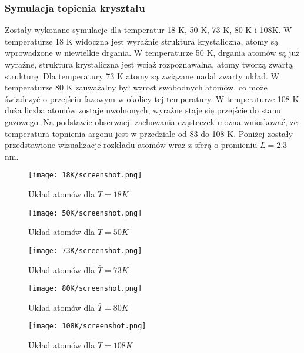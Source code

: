 \documentclass[a4paper,10pt]{article}
\begin{document}
	\subsubsection{Symulacja topienia kryształu}
	Zostały wykonane symulacje dla temperatur 18 K, 50 K, 73 K, 80 K i 108K. W temperaturze 18 K widoczna jest wyraźnie struktura krystaliczna, atomy są wprowadzone w niewielkie drgania. W temperaturze 50 K, drgania atomów są już wyraźne, struktura krystaliczna jest wciąż rozpoznawalna, atomy tworzą zwartą strukturę. Dla temperatury 73 K atomy są związane nadal zwarty układ. W temperaturze 80 K zauważalny był wzrost swobodnych atomów, co może świadczyć o przejściu fazowym w okolicy tej temperatury. W temperaturze 108 K duża liczba atomów zostaje uwolnonych, wyraźne staje się przejście do stanu gazowego. Na podstawie obserwacji zachowania cząsteczek można wnioskować, że temperatura topnienia argonu jest w przedziale od 83 do 108 K. Poniżej zostały przedstawione wizualizacje rozkładu atomów wraz z sferą o promieniu $L = 2.3$ nm.

	    \begin{figure}[h]
		    \centering
		    \texttt{[image: 18K/screenshot.png]}
		    \caption{Układ atomów dla $\bar{T} = 18 K$}
		    \label{18t}
	    \end{figure}

	    \begin{figure}[h]
		    \centering
		    \texttt{[image: 50K/screenshot.png]}
		    \caption{Układ atomów dla $\bar{T} = 50 K$}
		    \label{50t}
	    \end{figure}

	    \begin{figure}[h]
		    \centering
		    \texttt{[image: 73K/screenshot.png]}
		    \caption{Układ atomów dla $\bar{T} = 73 K$}
		    \label{73t}
	    \end{figure}

	    \begin{figure}[h]
		    \centering
		    \texttt{[image: 80K/screenshot.png]}
		    \caption{Układ atomów dla $\bar{T} = 80 K$}
		    \label{80t}
	    \end{figure}

	    \begin{figure}[h]
		    \centering
		    \texttt{[image: 108K/screenshot.png]}
		    \caption{Układ atomów dla $\bar{T} = 108 K$}
		    \label{108t}
	    \end{figure}
\end{document}
